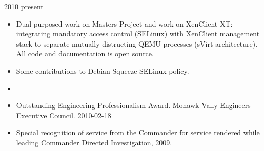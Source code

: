 \documentclass[letterpaper,11pt]{article}
\begin{document}
       {2010} {present}
      \begin {itemize}
        \setlength {\itemsep}{1pt}
        \setlength {\parskip}{0pt}
        \setlength {\parsep}{0pt}
      \item Dual purposed work on Masters Project and work on XenClient XT: integrating mandatory access control (SELinux) with XenClient management stack to separate mutually distructing QEMU processes (sVirt architecture).  All code and documentation is open source.
      \item Some contributions to Debian Squeeze SELinux policy.
      \end {itemize}
      \pagebreak
    \begin{itemize}
    \item[]
    \end{itemize}

    \begin {itemize}
      \setlength {\itemsep}{1pt}
      \setlength {\parskip}{0pt}
      \setlength {\parsep}{0pt}
    \item Outstanding Engineering Professionalism Award.
      Mohawk Vally Engineers Executive Council.
      2010-02-18
    \item Special recognition of service from the Commander for service rendered while leading Commander Directed Investigation, 2009.
    \end {itemize}
\end{document}
